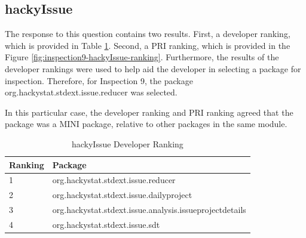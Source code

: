 \clearpage
\subsection{hackyIssue}
The response to this question contains two results. First, a developer
ranking, which is provided in Table \ref{tab:hackyIssue-developer-ranking}.
Second, a PRI ranking, which is provided in the Figure
\ref{fig:inspection9-hackyIssue-ranking}.  Furthermore, the results of the
developer rankings were used to help aid the developer in selecting a
package for inspection. Therefore, for Inspection 9, the package
org.hackystat.stdext.issue.reducer was selected.

In this particular case, the developer ranking and PRI ranking agreed that 
the package was a MINI package, relative to other packages in the
same module.

\begin{table}[!h]
  \begin{center}
    \caption{hackyIssue Developer Ranking}
    \label{tab:hackyIssue-developer-ranking}
    \begin{tabular}{|p{1.5cm}|p{11.5cm}|} \hline
{\bf Ranking} & {\bf Package} \\ \hline
1 & org.hackystat.stdext.issue.reducer \\ \hline
2 & org.hackystat.stdext.issue.dailyproject \\ \hline
3 & org.hackystat.stdext.issue.analysis.issueprojectdetails \\ \hline
4 & org.hackystat.stdext.issue.sdt \\ \hline
    \end{tabular}
  \end{center}
\end{table}


